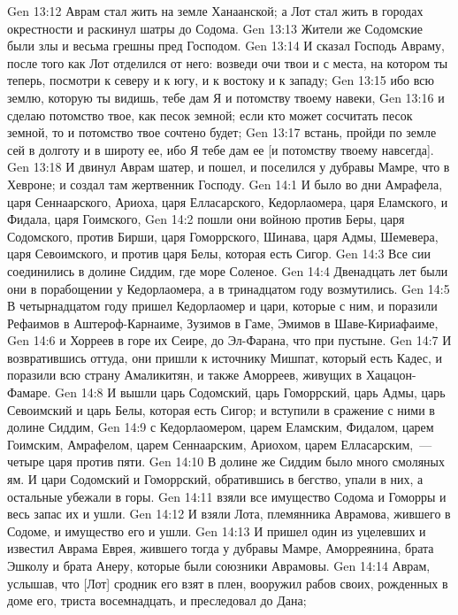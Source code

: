 \vs Gen 13:12 Аврам стал жить на земле Ханаанской; а Лот стал жить в городах окрестности и раскинул шатры до Содома.
\vs Gen 13:13 Жители же Содомские были злы и весьма грешны пред Господом.
\rsbpar\vs Gen 13:14 И сказал Господь Авраму, после того как Лот отделился от него: возведи очи твои и с места, на котором ты теперь, посмотри к северу и к югу, и к востоку и к западу;
\vs Gen 13:15 ибо всю землю, которую ты видишь, тебе дам Я и потомству твоему навеки,
\vs Gen 13:16 и сделаю потомство твое, как песок земной; если кто может сосчитать песок земной, то и потомство твое сочтено будет;
\vs Gen 13:17 встань, пройди по земле сей в долготу и в широту ее, ибо Я тебе дам ее [и потомству твоему навсегда].
\vs Gen 13:18 И двинул Аврам шатер, и пошел, и поселился у дубравы Мамре, что в Хевроне; и создал там жертвенник Господу.
\vs Gen 14:1 И было во дни Амрафела, царя Сеннаарского, Ариоха, царя Елласарского, Кедорлаомера, царя Еламского, и Фидала, царя Гоимского,
\vs Gen 14:2 пошли они войною против Беры, царя Содомского, против Бирши, царя Гоморрского, Шинава, царя Адмы, Шемевера, царя Севоимского, и против царя Белы, которая есть Сигор.
\vs Gen 14:3 Все сии соединились в долине Сиддим, где  море Соленое.
\vs Gen 14:4 Двенадцать лет были они в порабощении у Кедорлаомера, а в тринадцатом году возмутились.
\vs Gen 14:5 В четырнадцатом году пришел Кедорлаомер и цари, которые с ним, и поразили Рефаимов в Аштероф-Карнаиме, Зузимов в Гаме, Эмимов в Шаве-Кириафаиме,
\vs Gen 14:6 и Хорреев в горе их Сеире, до Эл-Фарана, что при пустыне.
\vs Gen 14:7 И возвратившись оттуда, они пришли к источнику Мишпат, который есть Кадес, и поразили всю страну Амаликитян, и также Аморреев, живущих в Хацацон-Фамаре.
\vs Gen 14:8 И вышли царь Содомский, царь Гоморрский, царь Адмы, царь Севоимский и царь Белы, которая есть Сигор; и вступили в сражение с ними в долине Сиддим,
\vs Gen 14:9 с Кедорлаомером, царем Еламским, Фидалом, царем Гоимским, Амрафелом, царем Сеннаарским, Ариохом, царем Елласарским,~--- четыре царя против пяти.
\vs Gen 14:10 В долине же Сиддим было много смоляных ям. И цари Содомский и Гоморрский, обратившись в бегство, упали в них, а остальные убежали в горы.
\vs Gen 14:11  взяли все имущество Содома и Гоморры и весь запас их и ушли.
\vs Gen 14:12 И взяли Лота, племянника Аврамова, жившего в Содоме, и имущество его и ушли.
\rsbpar\vs Gen 14:13 И пришел один из уцелевших и известил Аврама Еврея, жившего тогда у дубравы Мамре, Аморреянина, брата Эшколу и брата Анеру, которые были союзники Аврамовы.
\vs Gen 14:14 Аврам, услышав, что [Лот] сродник его взят в плен, вооружил рабов своих, рожденных в доме его, триста восемнадцать, и преследовал  до Дана;
